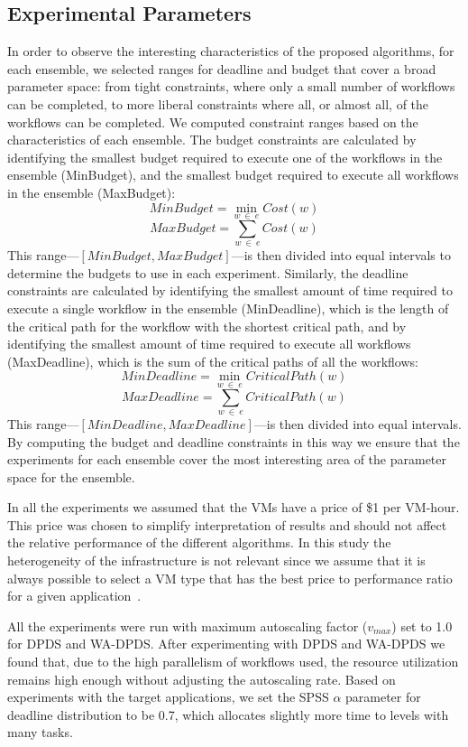 \documentclass[preprint,5p]{elsarticle}
\begin{document}
\subsection{Experimental Parameters}
\label{sec:exp-parameters}

In order to observe the interesting characteristics of the proposed algorithms,
for each ensemble, we selected ranges for deadline and budget that cover a broad
parameter space: from tight constraints, where only a small number of workflows can be completed,
to more liberal constraints where all, or almost all, of the workflows can be
completed. We computed constraint ranges based on
the characteristics of each ensemble. The budget constraints are calculated by
identifying the smallest budget required to execute one of the workflows in the
ensemble (MinBudget), and the smallest budget required to execute all workflows
in the ensemble (MaxBudget):
%
$$
MinBudget = \min_{w\ \in\ e}{Cost(w)}
$$
$$
MaxBudget = \sum_{w\ \in\ e}{Cost(w)}
$$
%
This range---$[MinBudget, MaxBudget]$---is then divided into equal intervals to
determine the budgets to use in each experiment. Similarly, the deadline
constraints are calculated by identifying the smallest amount
of time required to execute a single workflow in the ensemble (MinDeadline),
which is the length of the critical path for the workflow with the shortest
critical path, and by identifying the smallest amount of time required to
execute all workflows (MaxDeadline), which is the sum of the critical paths of
all the workflows:
%
$$
MinDeadline = \min_{w\ \in\ e}{CriticalPath(w)}
$$
$$
MaxDeadline = \sum_{w\ \in\ e}{CriticalPath(w)}
$$
%
This range---$[MinDeadline, MaxDeadline]$---is then divided into equal intervals. 
By computing the budget and deadline constraints in this way we ensure that the
experiments for each ensemble cover the most interesting area of the parameter space for the
ensemble.

In all the experiments we assumed that the VMs have a price of \$1 per VM-hour.
This price was chosen to simplify interpretation of results and should not
affect the relative performance of the different algorithms. In this study the
heterogeneity of the infrastructure is not relevant since we assume that it is
always possible to select a VM type that has the best price to performance ratio
for a given application~\cite{Juve2009}.

All the experiments were run with maximum autoscaling factor ($v_{max}$) set to
1.0 for DPDS and WA-DPDS. After experimenting with DPDS and WA-DPDS we found
that, due to the high parallelism of workflows used, the resource utilization
remains high enough without adjusting the autoscaling rate. Based on experiments
with the target applications, we set the SPSS $\alpha$ parameter for deadline
distribution to be 0.7, which allocates slightly more time to levels with many
tasks.
\end{document}
